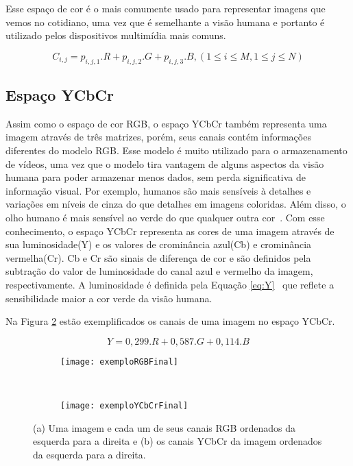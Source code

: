 Esse espaço de cor é o mais comumente usado para representar imagens que vemos no cotidiano, uma vez que é semelhante a visão humana e portanto é utilizado pelos dispositivos multimídia mais comuns.
	
	\begin{equation}
			C_{i,j} = p_{i,j,1} . R + p_{i,j,2} . G + p_{i,j,3} . B ,  (1\leq i\leq M, 1\leq j\leq N)
	\label{eq:corRGB}
	\end{equation}

\subsection{Espaço YCbCr}\label{sect:sub:ycbcr}

Assim como o espaço de cor RGB, o espaço YCbCr também representa uma imagem através de três matrizes, porém, seus canais contém informações diferentes do modelo RGB. Esse modelo é muito utilizado para o armazenamento de vídeos, uma vez que o modelo tira vantagem de alguns aspectos da visão humana para poder armazenar menos dados, sem perda significativa de informação visual. Por exemplo, humanos são mais sensíveis à detalhes e variações em níveis de cinza do que detalhes em imagens coloridas. Além disso, o olho humano é mais sensível ao verde do que qualquer outra cor~\cite{colorSpacesDigitalVideo}. Com esse conhecimento, o espaço YCbCr representa as cores de uma imagem através de sua luminosidade(Y) e os valores de crominância azul(Cb) e crominância vermelha(Cr). Cb e Cr são sinais de diferença de cor e são definidos pela subtração do valor de luminosidade do canal azul e vermelho da imagem, respectivamente. A luminosidade é definida pela Equação \ref{eq:Y}~\cite{LivroVideoDigital} que reflete a sensibilidade maior a cor verde da visão humana.

Na Figura \ref{fig:Espacos:sub:YCbCr} estão exemplificados os canais de uma imagem no espaço YCbCr.

\begin{equation}
	Y = 0,299.R + 0,587.G + 0,114.B
\label{eq:Y}
\end{equation}


\begin{figure}
 \centering
\begin{subfigure}{.5\textwidth}
  \centering
  \texttt{[image: exemploRGBFinal]}
	\caption{}
	\label{fig:Espacos:sub:RGB}
	\centering
\end{subfigure}\
\begin{subfigure}{.5\textwidth}
  \centering
  \texttt{[image: exemploYCbCrFinal]}
	\caption{}
	\label{fig:Espacos:sub:YCbCr}
	\centering
\end{subfigure}
\caption{(a) Uma imagem e cada um de seus canais RGB ordenados da esquerda para a direita e (b) os canais YCbCr da imagem ordenados da esquerda para a direita.}
\label{fig:Espacos}
\centering
\end{figure}

